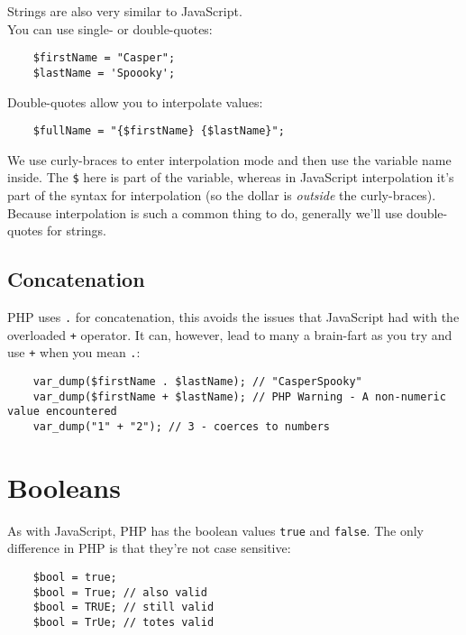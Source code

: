 Strings are also very similar to JavaScript.
\\

You can use single- or double-quotes:

\begin{verbatim}
    $firstName = "Casper";
    $lastName = 'Spoooky';
\end{verbatim}

Double-quotes allow you to interpolate values:

\begin{verbatim}
    $fullName = "{$firstName} {$lastName}";
\end{verbatim}

We use curly-braces to enter interpolation mode and then use the variable name inside. The \texttt{\$} here is part of the variable, whereas in JavaScript interpolation it's part of the syntax for interpolation (so the dollar is \textit{outside} the curly-braces).
\\

Because interpolation is such a common thing to do, generally we'll use double-quotes for strings.

\subsection{Concatenation}

PHP uses \texttt{.} for concatenation, this avoids the issues that JavaScript had with the overloaded \texttt{+} operator. It can, however, lead to many a brain-fart as you try and use \texttt{+} when you mean \texttt{.}:

\begin{verbatim}
    var_dump($firstName . $lastName); // "CasperSpooky"
    var_dump($firstName + $lastName); // PHP Warning - A non-numeric value encountered
    var_dump("1" + "2"); // 3 - coerces to numbers
\end{verbatim}


\section{Booleans}

As with JavaScript, PHP has the boolean values \texttt{true} and \texttt{false}. The only difference in PHP is that they're not case sensitive:

\begin{verbatim}
    $bool = true;
    $bool = True; // also valid
    $bool = TRUE; // still valid
    $bool = TrUe; // totes valid
\end{verbatim}

